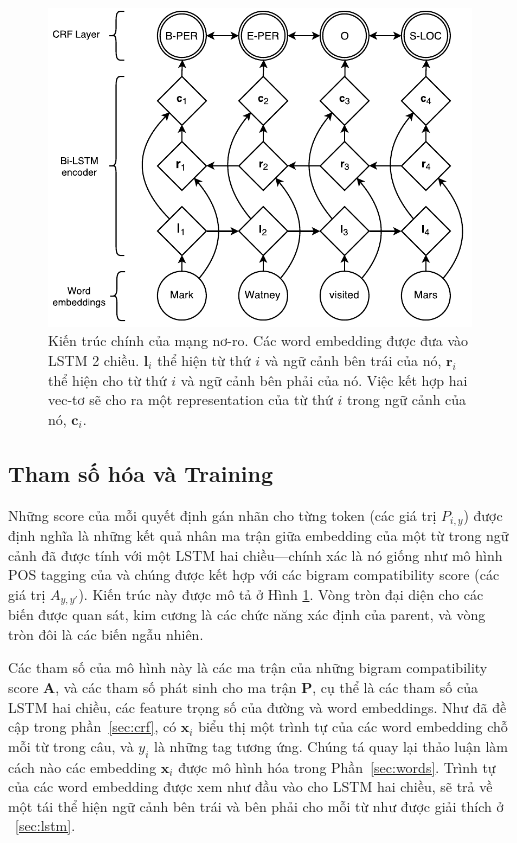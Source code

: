\documentclass[11pt,letterpaper]{article}
\begin{document}
\begin{figure}
  \centering
    \includegraphics[scale=0.64]{bilstm-crf4}
  \caption{Kiến trúc chính của mạng nơ-ro. Các word embedding được đưa vào LSTM 2 chiều. $\mathbf{l}_i$ thể hiện từ thứ $i$ và ngữ cảnh bên trái của nó, $\mathbf{r}_i$ thể hiện cho từ thứ $i$ và ngữ cảnh bên phải của nó. Việc kết hợp hai vec-tơ sẽ cho ra một representation của từ thứ $i$ trong ngữ cảnh của nó, $\mathbf{c}_i$.}
  \label{fig:bilstm-crf}
\end{figure}

\subsection{Tham số hóa và Training}
Những score của mỗi quyết định gán nhãn cho từng token (các giá trị $P_{i,y}$) được định nghĩa là những kết quả nhân ma trận giữa embedding của một từ trong ngữ cảnh đã được tính với một LSTM hai chiều---chính xác là nó giống như mô hình POS tagging của  và chúng được kết hợp với các bigram compatibility score (các giá trị $A_{y,y'}$). Kiến trúc này được mô tả ở Hình \ref{fig:bilstm-crf}. 
Vòng tròn đại diện cho các biến được quan sát, kim cương là các chức năng xác định của parent, và vòng tròn đôi là các biến ngẫu nhiên.

Các tham số của mô hình này là các ma trận của những bigram compatibility score $\mathbf{A}$, và 
các tham số phát sinh cho ma trận $\mathbf{P}$, cụ thể là các tham số của LSTM hai chiều, các feature trọng số của đường và word embeddings. Như đã đề cập trong phần~\ref{sec:crf}, có $\mathbf{x}_i$ biểu thị một trình tự của các word embedding chỗ mỗi từ trong câu, và $y_i$ là những tag tương ứng. Chúng tá quay lại thảo luận làm cách nào các embedding $\mathbf{x}_i$ được mô hình hóa trong Phần~\ref{sec:words}. Trình tự của các word embedding được xem như đầu vào cho LSTM hai chiều, sẽ trả về một tái thể hiện ngữ cảnh bên trái và bên phải cho mỗi từ như được giải thích ở ~\ref{sec:lstm}.
\end{document}

